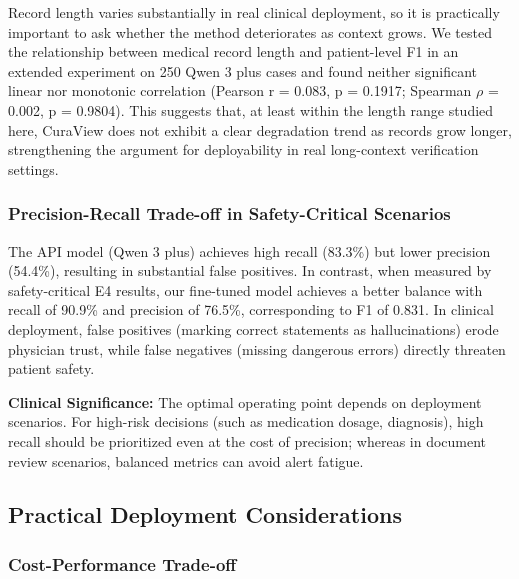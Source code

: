 \documentclass[11pt]{article}
\begin{document}
Record length varies substantially in real clinical deployment, so it is practically important to ask whether the method deteriorates as context grows. We tested the relationship between medical record length and patient-level F1 in an extended experiment on 250 Qwen 3 plus cases and found neither significant linear nor monotonic correlation (Pearson r = 0.083, p = 0.1917; Spearman \(\rho\) = 0.002, p = 0.9804). This suggests that, at least within the length range studied here, CuraView does not exhibit a clear degradation trend as records grow longer, strengthening the argument for deployability in real long-context verification settings.

\subsubsection{Precision-Recall Trade-off in Safety-Critical Scenarios}

The API model (Qwen 3 plus) achieves high recall (83.3\%) but lower precision (54.4\%), resulting in substantial false positives. In contrast, when measured by safety-critical E4 results, our fine-tuned model achieves a better balance with recall of 90.9\% and precision of 76.5\%, corresponding to F1 of 0.831. In clinical deployment, false positives (marking correct statements as hallucinations) erode physician trust, while false negatives (missing dangerous errors) directly threaten patient safety.

\textbf{Clinical Significance:} The optimal operating point depends on deployment scenarios. For high-risk decisions (such as medication dosage, diagnosis), high recall should be prioritized even at the cost of precision; whereas in document review scenarios, balanced metrics can avoid alert fatigue.

\subsection{Practical Deployment Considerations}

\subsubsection{Cost-Performance Trade-off}
\end{document}
